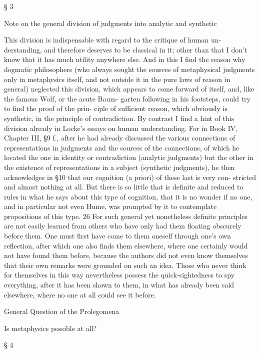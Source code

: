 § 3

Note on the general division of judgments
into analytic and synthetic

This division is indispensable with regard to the critique of human un-
derstanding, and therefore deserves to be classical in it; other than that I
don’t know that it has much utility anywhere else. And in this I ﬁnd the
reason why dogmatic philosophers (who always sought the sources of
metaphysical judgments only in metaphysics itself, and not outside it in
the pure laws of reason in general) neglected this division, which appears
to come forward of itself, and, like the famous Wolf, or the acute Baum-
garten following in his footsteps, could try to ﬁnd the proof of the prin-
ciple of sufﬁcient reason, which obviously is synthetic, in the principle of
contradiction. By contrast I ﬁnd a hint of this division already in Locke’s
essays on human understanding. For in Book IV, Chapter III, §9 f., after
he had already discussed the various connections of representations in
judgments and the sources of the connections, of which he located the
one in identity or contradiction (analytic judgments) but the other in the
existence of representations in a subject (synthetic judgments), he then
acknowledges in §10 that our cognition (a priori) of these last is very con-
stricted and almost nothing at all. But there is so little that is deﬁnite
and reduced to rules in what he says about this type of cognition, that it
is no wonder if no one, and in particular not even Hume, was prompted
by it to contemplate propositions of this type. 26 For such general yet
nonetheless deﬁnite principles are not easily learned from others who
have only had them ﬂoating obscurely before them. One must ﬁrst have
come to them oneself through one’s own reﬂection, after which one also
ﬁnds them elsewhere, where one certainly would not have found them
before, because the authors did not even know themselves that their
own remarks were grounded on such an idea. Those who never think for
themselves in this way nevertheless possess the quick-sightedness to spy
everything, after it has been shown to them, in what has already been
said elsewhere, where no one at all could see it before.

General Question of the Prolegomena

Is metaphysics possible at all?

§ 4

